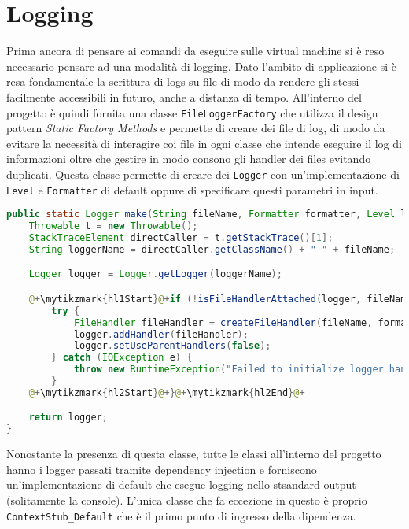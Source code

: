 \section{Logging}
Prima ancora di pensare ai comandi da eseguire sulle virtual machine si è reso necessario pensare ad una modalità di logging. Dato l'ambito di applicazione si è resa fondamentale la scrittura di logs su file di modo da rendere gli stessi facilmente accessibili in futuro, anche a distanza di tempo.\medbreak
All'interno del progetto è quindi fornita una classe \texttt{FileLoggerFactory} che utilizza il design pattern \emph{Static Factory Methods} \cite{effectiveJava} e permette di creare dei file di log, di modo da evitare la necessità di interagire coi file in ogni classe che intende eseguire il log di informazioni oltre che gestire in modo consono gli handler dei files evitando duplicati. Questa classe permette di creare dei \texttt{Logger} con un'implementazione di \texttt{Level} e \texttt{Formatter} di default oppure di specificare questi parametri in input.
\begin{lstlisting}[language=Java, caption=Metodo make di FileLoggerFactory, label=code:FileLoggerFactoryMake]
public static Logger make(String fileName, Formatter formatter, Level level) {
    Throwable t = new Throwable();
    StackTraceElement directCaller = t.getStackTrace()[1];
    String loggerName = directCaller.getClassName() + "-" + fileName;

    Logger logger = Logger.getLogger(loggerName);

    @+\mytikzmark{hl1Start}@+if (!isFileHandlerAttached(logger, fileName)) {@+\mytikzmark{hl1End}@+
        try {
            FileHandler fileHandler = createFileHandler(fileName, formatter, level);
            logger.addHandler(fileHandler);
            logger.setUseParentHandlers(false);
        } catch (IOException e) {
            throw new RuntimeException("Failed to initialize logger handler.", e);
        }
    @+\mytikzmark{hl2Start}@+}@+\mytikzmark{hl2End}@+

    return logger;
}
    \end{lstlisting}
Nonostante la presenza di questa classe, tutte le classi all'interno del progetto hanno i logger passati tramite dependency injection e forniscono un'implementazione di default che esegue logging nello stsandard output (solitamente la console). L'unica classe che fa eccezione in questo è proprio \texttt{ContextStub\_Default} che è il primo punto di ingresso della dipendenza.\\
